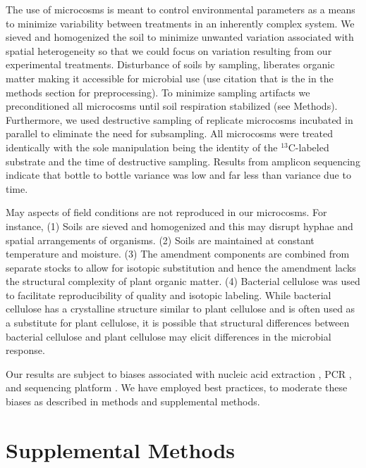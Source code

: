 \documentclass{article}
\begin{document}
The use of microcosms is meant to control environmental parameters as a means
to minimize variability between treatments in an inherently complex system. We
sieved and homogenized the soil to minimize unwanted variation associated with
spatial heterogeneity so that we could focus on variation resulting from our
experimental treatments. Disturbance of soils by sampling, liberates organic
matter making it accessible for microbial use (use citation that is the in the
methods section for preprocessing). To minimize sampling artifacts we
preconditioned all microcosms until soil respiration stabilized (see Methods).
Furthermore, we used destructive sampling of replicate microcosms incubated in
parallel to eliminate the need for subsampling. All microcosms were
treated identically with the sole manipulation being the identity of the
$^{13}$C-labeled substrate and the time of destructive sampling. Results from
amplicon sequencing indicate that bottle to bottle variance was low and far
less than variance due to time.

May aspects of field conditions are not reproduced in our microcosms. For
instance, (1) Soils are sieved and homogenized and this may disrupt hyphae and
spatial arrangements of organisms. (2) Soils are maintained at constant
temperature and moisture. (3) The amendment components are combined from
separate stocks to allow for isotopic substitution and hence the amendment
lacks the structural complexity of plant organic matter. (4) Bacterial
cellulose was used to facilitate reproducibility of quality and isotopic
labeling. While bacterial cellulose has a crystalline structure similar
to plant cellulose and is often used as a substitute for plant
cellulose, it is possible that structural differences between bacterial
cellulose and plant cellulose may elicit differences in the microbial response.

Our results are subject to biases associated with nucleic acid extraction
\citep{albertsen_2015}, PCR \citep{parada_2015}, and sequencing platform
\citep{tremblay_2015}. We have employed best practices, to moderate these
biases as described in methods and supplemental methods.

\section{Supplemental Methods} 
\end{document}
